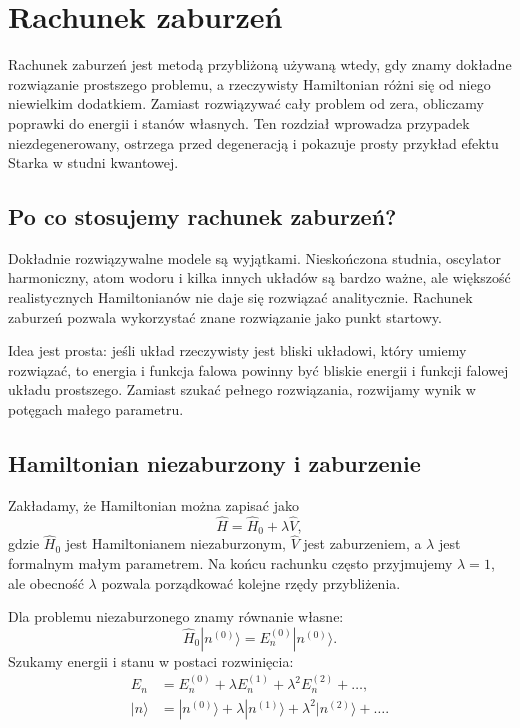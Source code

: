 \chapter{Rachunek zaburzeń}

\begin{summarybox}
Rachunek zaburzeń jest metodą przybliżoną używaną wtedy, gdy znamy dokładne
rozwiązanie prostszego problemu, a rzeczywisty Hamiltonian różni się od niego
niewielkim dodatkiem. Zamiast rozwiązywać cały problem od zera, obliczamy poprawki
do energii i stanów własnych. Ten rozdział wprowadza przypadek niezdegenerowany,
ostrzega przed degeneracją i pokazuje prosty przykład efektu Starka w studni
kwantowej.
\end{summarybox}

\section{Po co stosujemy rachunek zaburzeń?}

Dokładnie rozwiązywalne modele są wyjątkami. Nieskończona studnia, oscylator harmoniczny, atom wodoru i kilka innych układów są bardzo ważne, ale większość realistycznych Hamiltonianów nie daje się rozwiązać analitycznie. Rachunek zaburzeń pozwala wykorzystać znane rozwiązanie jako punkt startowy.

Idea jest prosta: jeśli układ rzeczywisty jest bliski układowi, który umiemy rozwiązać, to energia i funkcja falowa powinny być bliskie energii i funkcji falowej układu prostszego. Zamiast szukać pełnego rozwiązania, rozwijamy wynik w potęgach małego parametru.

\section{Hamiltonian niezaburzony i zaburzenie}

Zakładamy, że Hamiltonian można zapisać jako
\begin{equation}
    \hat{H}=\hat{H}_0+\lambda \hat{V},
\end{equation}
gdzie \(\hat{H}_0\) jest Hamiltonianem niezaburzonym, \(\hat{V}\) jest zaburzeniem, a \(\lambda\) jest formalnym małym parametrem. Na końcu rachunku często przyjmujemy \(\lambda=1\), ale obecność \(\lambda\) pozwala porządkować kolejne rzędy przybliżenia.

Dla problemu niezaburzonego znamy równanie własne:
\begin{equation}
    \hat{H}_0|n^{(0)}\rangle=E_n^{(0)}|n^{(0)}\rangle.
\end{equation}
Szukamy energii i stanu w postaci rozwinięcia:
\begin{align}
    E_n &= E_n^{(0)}+\lambda E_n^{(1)}+\lambda^2E_n^{(2)}+\ldots,\\
    |n\rangle &= |n^{(0)}\rangle+\lambda |n^{(1)}\rangle+\lambda^2|n^{(2)}\rangle+\ldots .
\end{align}

